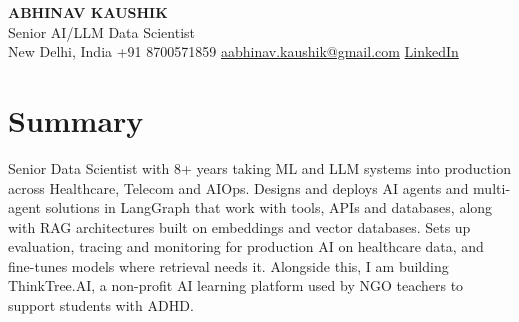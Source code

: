 \documentclass[10pt,a4paper]{article}
\begin{document}
\begin{center}
  {\LARGE\bfseries ABHINAV KAUSHIK}\\[2pt]
  {\large Senior AI/LLM Data Scientist}\\[2pt]
  New Delhi, India \textbar{} +91 8700571859 \textbar{} \href{mailto:aabhinav.kaushik@gmail.com}{aabhinav.kaushik@gmail.com} \textbar{} \href{https://www.linkedin.com/in/abhinav-kaushik10/}{LinkedIn}  
\end{center}

\section{Summary}
Senior Data Scientist with 8+ years taking ML and LLM systems into production across Healthcare, Telecom and AIOps. Designs and deploys AI agents and multi-agent solutions in LangGraph that work with tools, APIs and databases, along with RAG architectures built on embeddings and vector databases. Sets up evaluation, tracing and monitoring for production AI on healthcare data, and fine-tunes models where retrieval needs it. Alongside this, I am building ThinkTree.AI, a non-profit AI learning platform used by NGO teachers to support students with ADHD.
\end{document}
